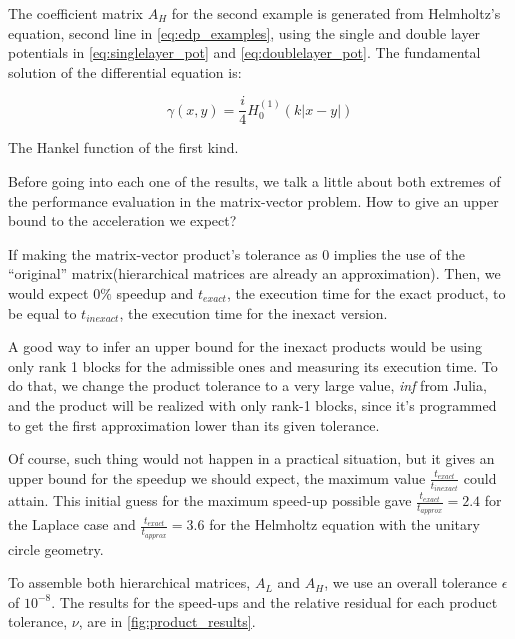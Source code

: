 The coefficient matrix $A_{H}$ for the second example is generated from Helmholtz's equation, second line in \autoref{eq:edp_examples}, using the single and double layer potentials in \autoref{eq:singlelayer_pot} and \autoref{eq:doublelayer_pot}. The fundamental solution of the differential equation is:

\begin{equation}
    \gamma(x,y) = \frac{i}{4} H_{0}^{(1)}(k|x-y|)
\end{equation}

The Hankel function of the first kind.

Before going into each one of the results, we talk a little about both extremes of the performance evaluation in the matrix-vector problem. How to give an upper bound to the acceleration we expect?

If making the matrix-vector product's tolerance as 0 implies the use of the “original”   matrix(hierarchical matrices are already an approximation). Then, we would expect 0$\%$ speedup and $t_{exact}$, the execution time for the exact product, to be equal to $t_{inexact}$, the execution time for the inexact version.

A good way to infer an upper bound for the inexact products would be using only rank 1 blocks for the admissible ones and measuring its execution time. To do that, we change the product tolerance to a very large value, \textit{inf} from Julia, and the product will be realized with only rank-1 blocks, since it's programmed to get the first approximation lower than its given tolerance.

Of course, such thing would not happen in a practical situation, but it gives an upper bound for the speedup we should expect, the maximum value $\frac{t_{exact}}{t_{inexact}}$ could attain. This initial guess for the maximum speed-up possible gave $\frac{t_{exact}}{t_{approx}}=2.4$ for the Laplace case and $\frac{t_{exact}}{t_{approx}}=3.6$ for the Helmholtz equation with the unitary circle geometry.

To assemble both hierarchical matrices, $A_{L}$ and $A_{H}$, we use an overall tolerance $\epsilon$ of $10^{-8}$. The results for the speed-ups and the relative residual for each product tolerance, $\nu$, are in \autoref{fig:product_results}.

